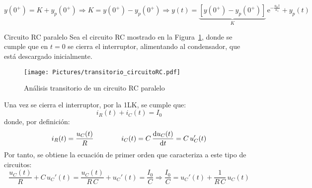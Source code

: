 \documentclass[11pt]{book} %
\makeatletter
\numberwithin{dummy}{section}
\theoremstyle{ocrenumbox}
\theoremstyle{blacknumex}
\theoremstyle{blacknumbox}
\theoremstyle{ocrenum}
\renewcommand{\subsection}{\@startsection {subsection}{2}{\z@}
{-3ex \@plus -0.1ex \@minus -.4ex}
{0.5ex \@plus.2ex }
{\normalfont\sffamily\bfseries}}
\makeatother
\begin{document}
	\begin{equation}\label{eq.ecuacion_1orden}
	    y(0^+)=K+y_p(0^+)\Rightarrow K=y(0^+)-y_p(0^+)\Rightarrow \boxed{y(t)=\underbrace{\left[y(0^+)-y_p(0^+) \right]}_{K}\,\mathrm{e}^{-\frac{a_0\,t}{a_1}}+y_p(t)}
	\end{equation}
	
    \subsection{Circuito RC paralelo}
	Sea el circuito RC mostrado en la Figura~\ref{fig.transitorio_RC}, donde se cumple que en $t = 0$ se cierra el interruptor, alimentando al condensador, que está descargado inicialmente. 
	\begin{figure}[htbp]
	    \centering
	    \texttt{[image: Pictures/transitorio\_circuitoRC.pdf]}
	    \caption{Análisis transitorio de un circuito RC paralelo}
	    \label{fig.transitorio_RC}
	\end{figure}
	
    Una vez se cierra el interruptor, por la 1LK, se cumple que:
	\begin{equation*}
	    i_R(t) + i_C(t) = I_0
	\end{equation*}
	donde, por definición: 
	\begin{equation*}
	    i_R(t)=\dfrac{u_C(t)}{R}\qquad\qquad i_C(t)=C\,\diff{u_C(t)}{t}=C\,u_C'(t)
	\end{equation*}
	Por tanto, se obtiene la ecuación de primer orden que caracteriza a este tipo de circuitos:
	\begin{equation}\label{eq.1orden_C}
	    \dfrac{u_C(t)}{R}+C\, u_C'(t)=\dfrac{u_C(t)}{R\,C}+u_C'(t)=\dfrac{I_0}{C}\Rightarrow \boxed{\dfrac{I_0}{C}=u_C'(t)+\dfrac{1}{R\, C}\,u_C(t)}
	\end{equation}
	
\end{document}
